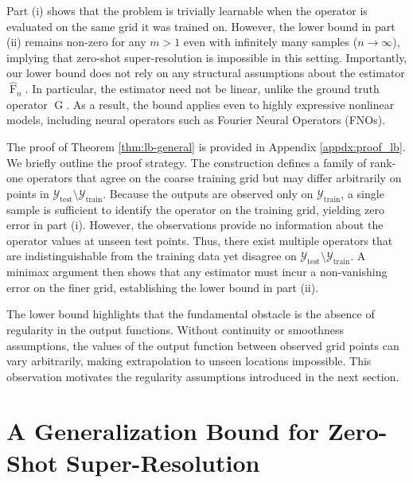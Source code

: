 \documentclass[11pt]{article}
\theoremstyle{plain}
\newcommand{\Ycal}{\mathcal{Y}}
\begin{document}
Part (i) shows that the problem is trivially learnable when the operator is evaluated on the same grid it was trained on. However, the lower bound in part (ii) remains non-zero for any $ m > 1 $ even with infinitely many samples ($n\to \infty$), implying that zero-shot super-resolution is impossible in this setting. Importantly, our lower bound does not rely on any structural assumptions about the estimator $ \widehat{\operatorname{F}}_n $. In particular, the estimator need not be linear, unlike the ground truth operator $ \operatorname{G} $. As a result, the bound applies even to highly expressive nonlinear models, including neural operators such as Fourier Neural Operators (FNOs). 

The proof of Theorem \ref{thm:lb-general} is provided in Appendix \ref{appdx:proof_lb}.  We briefly outline the proof strategy. The construction defines a family of
rank-one operators that agree on the coarse training grid but may differ
arbitrarily on points in $\Ycal_{\mathrm{test}}\setminus \Ycal_{\mathrm{train}}$.
Because the outputs are observed only on $\Ycal_{\mathrm{train}}$, a single sample
is sufficient to identify the operator on the training grid, yielding zero
error in part (i). However, the observations provide no information about the
operator values at unseen test points. Thus, there exist multiple
operators that are indistinguishable from the training data yet disagree on
$\Ycal_{\mathrm{test}}\setminus \Ycal_{\mathrm{train}}$. A minimax argument then shows
that any estimator must incur a non-vanishing error on the finer grid,
establishing the lower bound in part (ii). 

The lower bound highlights that the fundamental obstacle is the absence of
regularity in the output functions. Without continuity or smoothness
assumptions, the values of the output function between observed grid points
can vary arbitrarily, making extrapolation to unseen locations impossible.
This observation motivates the regularity assumptions introduced in the next
section.





\section{A Generalization Bound for Zero-Shot Super-Resolution}
\label{sec:upper}


\end{document}
